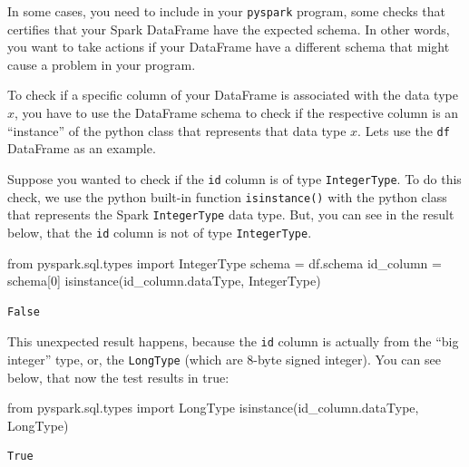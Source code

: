 \documentclass[
  11pt,
  letterpaper,
  DIV=11,
  numbers=noendperiod]{scrreprt}
\newenvironment{Shaded}{\begin{snugshade}}{\end{snugshade}}
\newcommand{\BuiltInTok}[1]{\textcolor[rgb]{0.00,0.23,0.31}{#1}}
\newcommand{\DecValTok}[1]{\textcolor[rgb]{0.68,0.00,0.00}{#1}}
\newcommand{\ImportTok}[1]{\textcolor[rgb]{0.00,0.46,0.62}{#1}}
\newcommand{\NormalTok}[1]{\textcolor[rgb]{0.00,0.23,0.31}{#1}}
\newcommand{\OperatorTok}[1]{\textcolor[rgb]{0.37,0.37,0.37}{#1}}
\begin{document}
In some cases, you need to include in your \texttt{pyspark} program,
some checks that certifies that your Spark DataFrame have the expected
schema. In other words, you want to take actions if your DataFrame have
a different schema that might cause a problem in your program.

To check if a specific column of your DataFrame is associated with the
data type \(x\), you have to use the DataFrame schema to check if the
respective column is an ``instance'' of the python class that represents
that data type \(x\). Lets use the \texttt{df} DataFrame as an example.

Suppose you wanted to check if the \texttt{id} column is of type
\texttt{IntegerType}. To do this check, we use the python built-in
function \texttt{isinstance()} with the python class that represents the
Spark \texttt{IntegerType} data type. But, you can see in the result
below, that the \texttt{id} column is not of type \texttt{IntegerType}.

\begin{Shaded}
\begin{Highlighting}[]
\ImportTok{from}\NormalTok{ pyspark.sql.types }\ImportTok{import}\NormalTok{ IntegerType}
\NormalTok{schema }\OperatorTok{=}\NormalTok{ df.schema}
\NormalTok{id\_column }\OperatorTok{=}\NormalTok{ schema[}\DecValTok{0}\NormalTok{]}
\BuiltInTok{isinstance}\NormalTok{(id\_column.dataType, IntegerType)}
\end{Highlighting}
\end{Shaded}

\begin{verbatim}
False
\end{verbatim}

This unexpected result happens, because the \texttt{id} column is
actually from the ``big integer'' type, or, the \texttt{LongType} (which
are 8-byte signed integer). You can see below, that now the test results
in true:

\begin{Shaded}
\begin{Highlighting}[]
\ImportTok{from}\NormalTok{ pyspark.sql.types }\ImportTok{import}\NormalTok{ LongType}
\BuiltInTok{isinstance}\NormalTok{(id\_column.dataType, LongType)}
\end{Highlighting}
\end{Shaded}

\begin{verbatim}
True
\end{verbatim}
\end{document}
